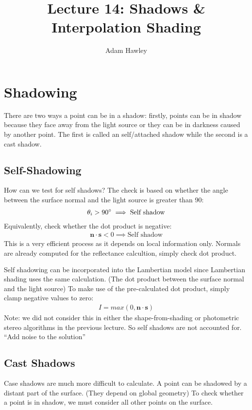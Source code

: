 \documentclass{article}
\author{Adam Hawley}
\title{Lecture 14: Shadows \& Interpolation Shading}
\begin{document}
\maketitle
\tableofcontents
\newpage

\section{Shadowing}
There are two ways a point can be in a shadow:
firstly, points can be in shadow because they face away from the light source or they can be in darkness caused by another point.
The first is called an self/attached shadow while the second is a cast shadow.

\subsection{Self-Shadowing}
How can we test for self shadows?
The check is based on whether the angle between the surface normal and the light source is greater than 90\degree:
\begin{align*}
	\theta_i > 90\degree \implies \text{Self shadow}
\end{align*}
Equivalently, check whether the dot product is negative:
\begin{align*}
	\textbf{n}\cdot\textbf{s}<0 \implies \text{Self shadow}
\end{align*}
This is a very efficient process as it depends on local information only.
Normals are already computed for the reflectance calcultion, simply check dot product.

Self shadowing can be incorporated into the Lambertian model since Lambertian shading uses the same calculation.
(The dot product between the surface normal and the light source)
To make use of the pre-calculated dot product, simply clamp negative values to zero:
\begin{align*}
	I = max(0,\textbf{n}\cdot\textbf{s})
\end{align*}
Note: we did not consider this in either the shape-from-shading or photometric stereo algorithms in the previous lecture.
So self shadows are not accounted for.
``Add noise to the solution'' %

\subsection{Cast Shadows}
Case shadows are much more difficult to calculate.
A point can be shadowed by a distant part of the surface.
(They depend on global geometry)
To check whether a point is in shadow, we must consider all other points on the surface.
\end{document}

